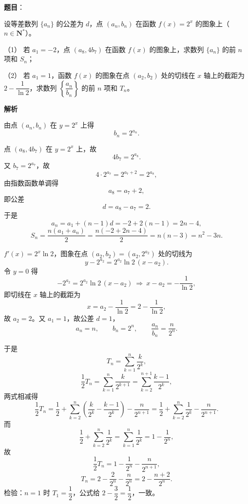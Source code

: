 \begin{answer}

\textbf{题目}：

设等差数列 $\{a_n\}$ 的公差为 $d$，点 $(a_n,b_n)$ 在函数 $f(x)=2^x$ 的图象上（$n\in\mathbf N^*$）。

（1） 若 $a_1=-2$，点 $(a_8,4b_7)$ 在函数 $f(x)$ 的图象上，求数列 $\{a_n\}$ 的前 $n$ 项和 $S_n$；

（2） 若 $a_1=1$，函数 $f(x)$ 的图象在点 $(a_2,b_2)$ 处的切线在 $x$ 轴上的截距为 $2-\dfrac1{\ln 2}$，求数列 $\left\{\dfrac{a_n}{b_n}\right\}$ 的前 $n$ 项和 $T_n$。

\textbf{解析}

由点 $(a_n,b_n)$ 在 $y=2^x$ 上得
\nopagebreak[4]
\[b_n=2^{a_n}.\]


点 $(a_8,4b_7)$ 在 $y=2^x$ 上，故
\nopagebreak[4]
\[4b_7=2^{a_8}.\]
又 $b_7=2^{a_7}$，故
\nopagebreak[4]
\[4\cdot 2^{a_7}=2^{a_7+2}=2^{a_8},\]
由指数函数单调得
\nopagebreak[4]
\[a_8=a_7+2,\]
即公差
\nopagebreak[4]
\[d=a_8-a_7=2 .\]
于是
\nopagebreak[4]
\[a_n=a_1+(n-1)d=-2+2(n-1)=2n-4,\]
\nopagebreak[4]
\[S_n=\frac{n(a_1+a_n)}2=\frac{n(-2+2n-4)}2=n(n-3)=n^2-3n .\]


$f'(x)=2^x\ln2$，图象在点 $(a_2,b_2)=(a_2,2^{a_2})$ 处的切线为
\nopagebreak[4]
\[y-2^{a_2}=2^{a_2}\ln2\,(x-a_2).\]
令 $y=0$ 得
\nopagebreak[4]
\[-2^{a_2}=2^{a_2}\ln2\,(x-a_2)
\ \Longrightarrow\ x-a_2=-\frac1{\ln2},\]
即切线在 $x$ 轴上的截距为
\nopagebreak[4]
\[x=a_2-\frac1{\ln2}=2-\frac1{\ln2},\]
故 $a_2=2$。又 $a_1=1$，故公差 $d=1$，
\nopagebreak[4]
\[a_n=n,\qquad b_n=2^n,\qquad \frac{a_n}{b_n}=\frac n{2^n}.\]

于是
\nopagebreak[4]
\[T_n=\sum_{k=1}^n\frac{k}{2^k},\]
\nopagebreak[4]
\[\frac12T_n=\sum_{k=1}^n\frac{k}{2^{k+1}}=\sum_{k=2}^{n+1}\frac{k-1}{2^k},\]
两式相减得
\nopagebreak[4]
\[\frac12T_n=\frac12+\sum_{k=2}^{n}\left(\frac{k}{2^k}-\frac{k-1}{2^k}\right)-\frac{n}{2^{n+1}}
=\frac12+\sum_{k=2}^{n}\frac1{2^k}-\frac{n}{2^{n+1}} .\]
而
\nopagebreak[4]
\[\frac12+\sum_{k=2}^{n}\frac1{2^k}=\sum_{k=1}^{n}\frac1{2^k}=1-\frac1{2^n},\]
故
\nopagebreak[4]
\[\frac12T_n=1-\frac1{2^n}-\frac{n}{2^{n+1}},\]
\nopagebreak[4]
\[T_n=2-\frac2{2^n}-\frac{n}{2^n}=2-\frac{n+2}{2^n} .\]
检验：$n=1$ 时 $T_1=\dfrac12$，公式给 $2-\dfrac32=\dfrac12$，一致。



\end{answer}

